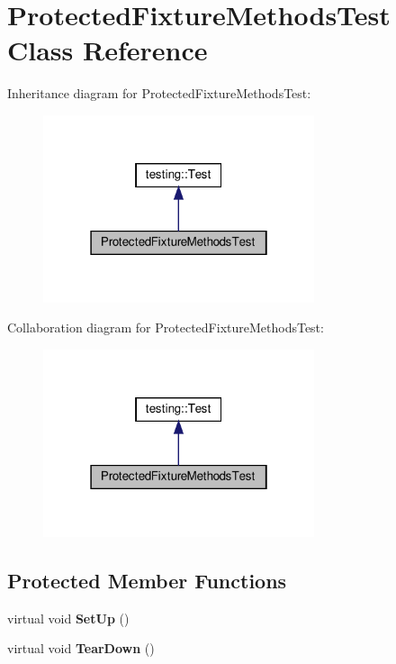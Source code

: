 \hypertarget{class_protected_fixture_methods_test}{}\section{Protected\+Fixture\+Methods\+Test Class Reference}
\label{class_protected_fixture_methods_test}


Inheritance diagram for Protected\+Fixture\+Methods\+Test\+:
\nopagebreak
\begin{figure}[H]
\begin{center}
\leavevmode
\includegraphics[width=226pt]{class_protected_fixture_methods_test__inherit__graph}
\end{center}
\end{figure}


Collaboration diagram for Protected\+Fixture\+Methods\+Test\+:
\nopagebreak
\begin{figure}[H]
\begin{center}
\leavevmode
\includegraphics[width=226pt]{class_protected_fixture_methods_test__coll__graph}
\end{center}
\end{figure}
\subsection*{Protected Member Functions}
\begin{DoxyCompactItemize}
\item 
\mbox{\label{class_protected_fixture_methods_test_a5184c708ac89cfb69f0e4c742e93398a}} 
virtual void {\bfseries Set\+Up} ()
\item 
\mbox{\label{class_protected_fixture_methods_test_aa143dff0a99903cde207b6fd0042c03c}} 
virtual void {\bfseries Tear\+Down} ()
\end{DoxyCompactItemize}
